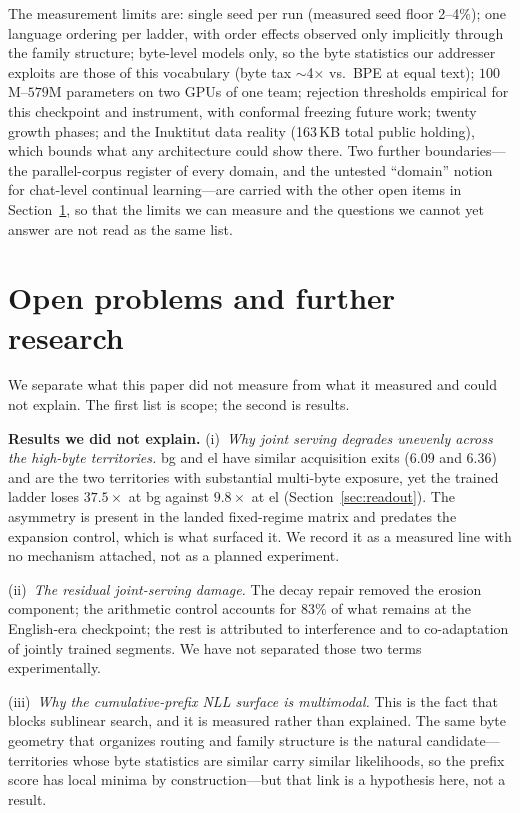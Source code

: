 \documentclass[11pt]{article}
\theoremstyle{definition}\newtheorem{definition}{Definition}
\theoremstyle{remark}\newtheorem{remark}{Remark}
\begin{document}
The measurement limits are: single seed per run (measured seed floor 2--4\%); one
language ordering per ladder, with order effects observed only implicitly through the
family structure; byte-level models only, so the byte statistics our addresser exploits
are those of this vocabulary (byte tax $\sim$4$\times$ vs.\ BPE at equal text);
$100$M--$579$M parameters on two GPUs of one team; rejection thresholds empirical for this
checkpoint and instrument, with conformal freezing future work; twenty growth phases; and
the Inuktitut data reality (163\,KB total public holding), which bounds what any
architecture could show there. Two further boundaries---the parallel-corpus register of
every domain, and the untested ``domain'' notion for chat-level continual learning---are
carried with the other open items in Section~\ref{sec:open}, so that the limits we can
measure and the questions we cannot yet answer are not read as the same list.

\section{Open problems and further research}
\label{sec:open}

We separate what this paper did not measure from what it measured and could not explain.
The first list is scope; the second is results.

\textbf{Results we did not explain.} (i)~\emph{Why joint serving degrades unevenly
across the high-byte territories.} bg and el have similar acquisition exits ($6.09$ and
$6.36$) and are the two territories with substantial multi-byte exposure, yet the trained
ladder loses $37.5\times$ at bg against $9.8\times$ at el (Section~\ref{sec:readout}). The
asymmetry is present in the landed fixed-regime matrix and predates the expansion control,
which is what surfaced it. We record it as a measured line with no mechanism attached, not
as a planned experiment.

(ii)~\emph{The residual joint-serving damage.} The decay repair removed the erosion
component; the arithmetic control accounts for 83\% of what remains at the English-era
checkpoint; the rest is attributed to interference and to co-adaptation of jointly
trained segments. We have not separated those two terms experimentally.

(iii)~\emph{Why the cumulative-prefix NLL surface is multimodal.} This is the fact that
blocks sublinear search, and it is measured rather than explained. The same byte geometry
that organizes routing and family structure is the natural candidate---territories whose
byte statistics are similar carry similar likelihoods, so the prefix score has local
minima by construction---but that link is a hypothesis here, not a result.
\end{document}
